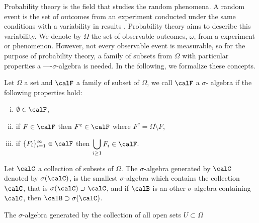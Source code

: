 Probability theory  is the field that  studies the random phenomena. A random event is the set of  outcomes from an 
experiment conducted under the same conditions  with a variability in results . Probability theory aims to 
describe  this variability. We denote by $\Omega$ the set of observable outcomes, $\omega$, from a
experiment or phenomenon.  However, not every observable event is measurable, so  for the purpose of probability 
theory, a family of subsets from $\Omega$ with particular properties  a ----$\sigma$-algebra is needed. In 
the following, we formalize these concepts.	


\begin{definition}
	Let $\Omega$ a set and $\calF$ a family of subset of $\Omega$, we call $\calF$ a 
	$\sigma$- algebra if the following properties hold:
	\begin{enumerate}[(i)]
		\item $\emptyset \in \calF$,
		\item if $F\in \calF$ then $F^c\in\calF$ where $F^c = \Omega \setminus F$,
		\item if $\displaystyle \{F_i\}_{i=1}^\infty \in \calF $ then 
			$\displaystyle \bigcup_{i\geq 1} F_i \in \calF$.
	\end{enumerate}
\end{definition}

	Let $\calC$ a collection of subsets of $\Omega$. The $\sigma$-algebra generated by $\calC$
denoted by $\sigma(\calC)$, is the smallest $\sigma$-algebra which contains the collection $\calC$, that is
$\sigma(\calC)\supset \calC$, and if $\calB$ is an other $\sigma$-algebra containing $\calC$, then
$\calB \supset \sigma(\calC)$.
\begin{definition}
	The $\sigma$-algebra generated by the collection of all open sets $U \subset \Omega$ 
\end{definition}
	
